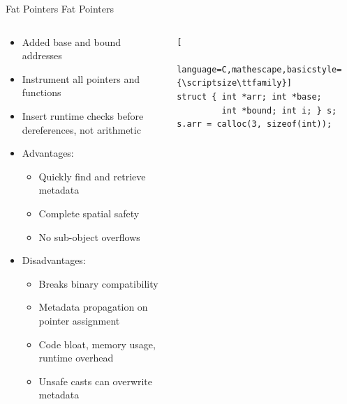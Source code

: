 \documentclass[aspectratio=169]{beamer}
\begin{document}
\begin{frame}[fragile]{Fat Pointers}
  \footnotesize
Fat Pointers
\vspace{-0.1in}
\pause
\begin{columns}[T]
\begin{column}{0.64\textwidth}
\begin{itemize}[<+->]
 \item Added base and bound addresses 
 \item Instrument all pointers and functions
 \item Insert runtime checks \alert{before dereferences}, not arithmetic 
 \item Advantages:
     \begin{itemize}
        \item Quickly find and retrieve metadata 
        \item Complete spatial safety 
        \item No sub-object overflows 
     \end{itemize}
 \item Disadvantages:
     \begin{itemize}
        \item Breaks binary compatibility 
        \item Metadata propagation on pointer assignment
        \item Code bloat, memory usage, runtime overhead 
        \item Unsafe casts can overwrite metadata
     \end{itemize}
\end{itemize}
\end{column}

\begin{column}{0.40\textwidth}

   \pause

    \vspace{-0.2in}
\begin{lstlisting}[
    language=C,mathescape,basicstyle={\scriptsize\ttfamily}]
struct { int *arr; int *base;
         int *bound; int i; } s;
s.arr = calloc(3, sizeof(int));
\end{lstlisting}


\end{column}
\end{columns}
\end{frame}
\end{document}
